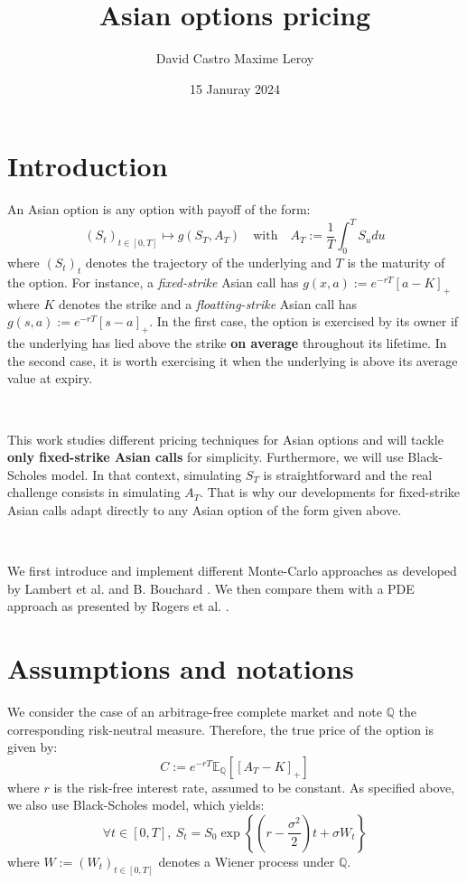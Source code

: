 \documentclass{article}
\title{Asian options pricing}
\author{David Castro \qquad Maxime Leroy}
\date{15 Januray 2024}
\begin{document}
\maketitle

\section*{Introduction}

An Asian option is any option with payoff of the form:
\[
	\left( S_t \right)_{t \in [0, T]} \mapsto g \left( S_T, A_T \right) \quad \text{with} \quad A_T := \frac{1}{T} \int_0^T S_u du
\]
where $\left( S_t \right)_t$ denotes the trajectory of the underlying and $T$ is the maturity of the option.
For instance, a \textit{fixed-strike} Asian call has $g(x, a) := e^{-rT} \left[ a - K \right]_+$ where $K$ denotes the strike
and a \textit{floatting-strike} Asian call has $g(s, a) := e^{-rT}  \left[ s - a \right]_+$.
In the first case, the option is exercised by its owner
if the underlying has lied above the strike \textbf{on average} throughout its lifetime. In the second case,
it is worth exercising it when the underlying is above its average value at expiry.

\

This work studies different pricing techniques for Asian options and will tackle \textbf{only fixed-strike Asian calls}
for simplicity. Furthermore, we will use Black-Scholes model. In that context, simulating $S_T$ is straightforward
and the real challenge consists in simulating $A_T$. That is why our developments for fixed-strike Asian calls
adapt directly to any Asian option of the form given above.

\

We first introduce and implement different Monte-Carlo approaches as developed by Lambert et al. \cite{main}
and B. Bouchard \cite{Bouchard}. We then compare them with a PDE approach as presented by
Rogers et al. \cite{Rogers}.

\section*{Assumptions and notations}

We consider the case of an arbitrage-free complete market and note $\mathbb Q$ the corresponding
risk-neutral measure. Therefore, the true price of the option is given by:
\[
	C := e^{-rT} \mathbb E_{\mathbb Q} \left[ [ A_T - K ]_+ \right]
\]
where $r$ is the risk-free interest rate, assumed to be constant.
As specified above, we also use Black-Scholes model, which yields:
\begin{equation}
	\forall t \in [0, T], \ S_t = S_0 \exp \left\{ \left( r - \frac{\sigma^2}{2} \right) t + \sigma W_t \right\}
	\tag{BS}
\end{equation}
where $W := (W_t)_{t \in [0, T]}$ denotes a Wiener process under $\mathbb Q$.
\end{document}
